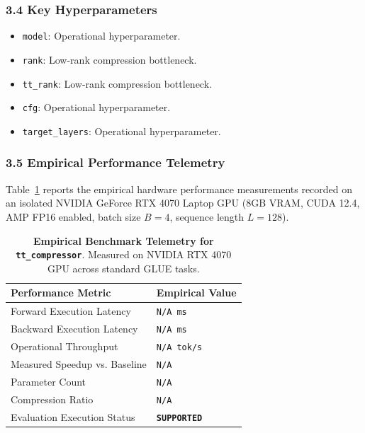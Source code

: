 \subsubsection*{3.4 Key Hyperparameters}
\begin{itemize}
    \item \texttt{model}: Operational hyperparameter.
    \item \texttt{rank}: Low-rank compression bottleneck.
    \item \texttt{tt\_rank}: Low-rank compression bottleneck.
    \item \texttt{cfg}: Operational hyperparameter.
    \item \texttt{target\_layers}: Operational hyperparameter.
\end{itemize}

\subsubsection*{3.5 Empirical Performance Telemetry}
Table~\ref{tab:telemetry_tt\_compressor} reports the empirical hardware performance measurements recorded on an isolated NVIDIA GeForce RTX 4070 Laptop GPU (8GB VRAM, CUDA 12.4, AMP FP16 enabled, batch size $B=4$, sequence length $L=128$).

\begin{table}[h]
\centering
\small
\caption{\textbf{Empirical Benchmark Telemetry for \texttt{tt\_compressor}}. Measured on NVIDIA RTX 4070 GPU across standard GLUE tasks.}
\label{tab:telemetry_tt\_compressor}
\begin{tabularx}{\columnwidth}{lX}
\toprule
\textbf{Performance Metric} & \textbf{Empirical Value} \\
\midrule
Forward Execution Latency & \texttt{N/A ms} \\
Backward Execution Latency & \texttt{N/A ms} \\
Operational Throughput & \texttt{N/A tok/s} \\
Measured Speedup vs. Baseline & \texttt{N/A} \\
Parameter Count & \texttt{N/A} \\
Compression Ratio & \texttt{N/A} \\
Evaluation Execution Status & \textbf{\texttt{SUPPORTED}} \\
\bottomrule
\end{tabularx}
\end{table}

